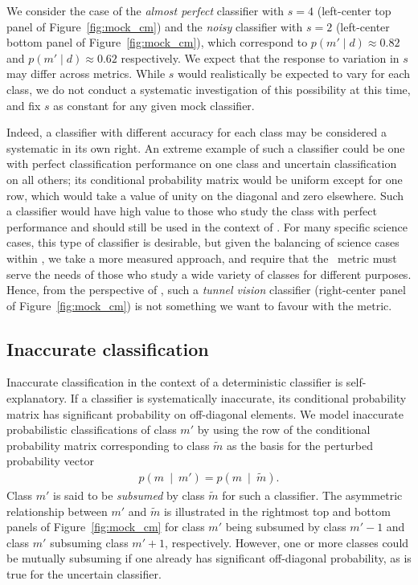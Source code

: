 We consider the case of the \textit{almost perfect} classifier with $s=4$ (left-center top panel of Figure~\ref{fig:mock_cm}) and the \textit{noisy} classifier with $s=2$ (left-center bottom panel of Figure~\ref{fig:mock_cm}), which correspond to $p(m' \mid d)\approx0.82$ and $p(m' \mid d)\approx0.62$ respectively. We expect that the response to variation in $s$ may differ across metrics. While $s$ would realistically be expected to vary for each class, we do not conduct a systematic investigation of this possibility at this time, and fix $s$ as constant for any given mock classifier.

Indeed, a classifier with different accuracy for each class may be considered a systematic in its own right. An extreme example of such a classifier could be one with perfect classification performance on one class and uncertain classification on all others; its conditional probability matrix would be uniform except for one row, which would take a value of unity on the diagonal and zero elsewhere. Such a classifier would have high value to those who study the class with perfect performance and should still be used in the context of \lsst. For many specific science cases, this type of classifier is desirable, but given the balancing of science cases within \lsst, we take a more measured approach, and require that the \plasticc\ metric must serve the needs of those who study a wide variety of classes for different purposes. Hence, from the perspective of \plasticc, such a \textit{tunnel vision} classifier (right-center panel of Figure~\ref{fig:mock_cm}) is not something we want to favour with the metric.

\subsection{Inaccurate classification}
\label{sec:inaccuratedata}

Inaccurate classification in the context of a deterministic classifier is self-explanatory.
If a classifier is systematically inaccurate, its conditional probability matrix has significant probability on off-diagonal elements.
We model inaccurate probabilistic classifications of class $m'$ by using the row of the conditional probability matrix corresponding to class $\tilde{m}$ as the basis for the perturbed probability vector
\begin{eqnarray}
  \label{eq:subsume}
  p(m\ \mid\ m') = p(m\ \mid\ \tilde{m}).
\end{eqnarray}
Class $m'$ is said to be \textit{subsumed} by class $\tilde{m}$ for such a classifier.
The asymmetric relationship between $m'$ and $\tilde{m}$ is illustrated in the rightmost top and bottom panels of Figure~\ref{fig:mock_cm} for class $m'$ being subsumed by class $m'-1$ and class $m'$ subsuming class $m'+1$, respectively.
However, one or more classes could be mutually subsuming if one already has significant off-diagonal probability, as is true for the uncertain classifier.

